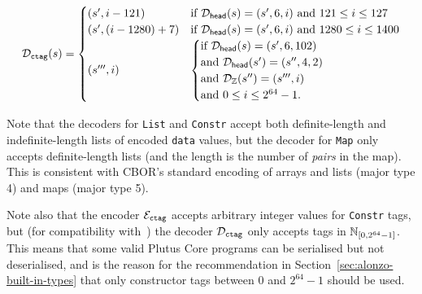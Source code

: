 \medskip
$$
\mathcal{D}_{\texttt{ctag}}(s) =
\begin{cases}
  (s', i-121) & \text{if $\mathcal{D}_{\mathsf{head}}(s) = (s', 6, i)$ and $121 \leq i \leq 127$}\\
  (s', (i-1280)+7) & \text{if $\mathcal{D}_{\mathsf{head}}(s) = (s', 6, i)$ and $1280 \leq i \leq 1400$}\\
  (s''', i) &
  \begin{cases}
    \text{if $\mathcal{D}_{\mathsf{head}}(s) = (s', 6, 102)$}\\
    \text{and $\mathcal{D}_{\mathsf{head}}(s') = (s'', 4, 2)$}\\
    \text{and $\mathcal{D}_{\mathbb{Z}}(s'') = (s''', i)$}\\
    \text{and $0 \leq i \leq 2^{64}-1$}.
    \end{cases}\\
  \end{cases}
$$

\noindent
Note that the decoders for \texttt{List} and \texttt{Constr} accept both
definite-length and indefinite-length lists of encoded \texttt{data} values, but
the decoder for \texttt{Map} only accepts definite-length lists (and the length
is the number of \textit{pairs} in the map).  This is consistent with CBOR's
standard encoding of arrays and lists (major type 4) and maps (major type 5).

Note also that the encoder $\mathcal{E}_{\texttt{ctag}}$ accepts arbitrary integer values for
\texttt{Constr} tags, but (for compatibility with~\cite{CBOR-alternatives}) the
decoder $\mathcal{D}_{\texttt{ctag}}$ only accepts tags in $\mathbb{N}_{[0,2^{64}-1]}$.  This
means that some valid Plutus Core programs can be serialised but not
deserialised, and is the reason for the recommendation in
Section~\ref{sec:alonzo-built-in-types} that only constructor tags between 0 and
$2^{64}-1$ should be used.
